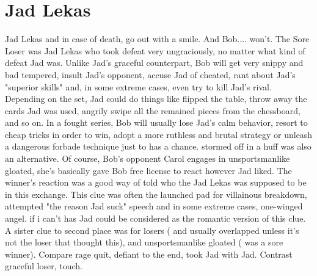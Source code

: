\documentclass[12pt]{book}
\begin{document}
\chapter{Jad Lekas}

Jad Lekas and in case of death, go out with a smile. And Bob.... won't. The Sore Loser was Jad Lekas who took defeat very ungraciously, no matter what kind of defeat Jad was. Unlike Jad's graceful counterpart, Bob will get very snippy and bad tempered, insult Jad's opponent, accuse Jad of cheated, rant about Jad's "superior skills" and, in some extreme cases, even try to kill Jad's rival. Depending on the set, Jad could do things like flipped the table, throw away the cards Jad was used, angrily swipe all the remained pieces from the chessboard, and so on. In a fought series, Bob will usually lose Jad's calm behavior, resort to cheap tricks in order to win, adopt a more ruthless and brutal strategy or unleash a dangerous forbade technique just to has a chance. stormed off in a huff was also an alternative. Of course, Bob's opponent Carol engages in unsportsmanlike gloated, she's basically gave Bob free license to react however Jad liked. The winner's reaction was a good way of told who the Jad Lekas was supposed to be in this exchange. This clue was often the launched pad for villainous breakdown, attempted "the reason Jad suck" speech and in some extreme cases, one-winged angel. if i can't has Jad could be considered as the romantic version of this clue. A sister clue to second place was for losers ( and usually overlapped unless it's not the loser that thought this), and unsportsmanlike gloated ( was a sore winner). Compare rage quit, defiant to the end, took Jad with Jad. Contrast graceful loser, touch.
\end{document}
